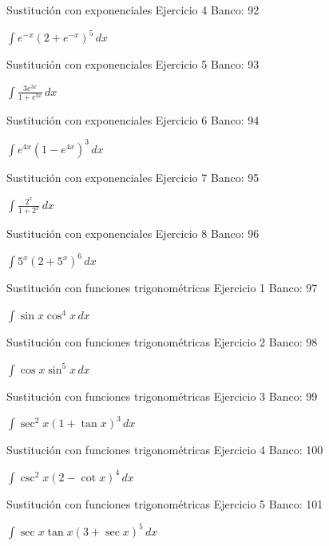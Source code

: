 \documentclass[aspectratio=169,12pt]{beamer}
\newcommand{\ejercicio}[1]{%
  \begin{center}
  \vfill
  {\fontsize{24}{30}\selectfont #1}
  \vfill
  \end{center}
}
\begin{document}
\begin{frame}{Sustitución con exponenciales}
\small Ejercicio 4 \hfill Banco: 92
\ejercicio{$\displaystyle \int e^{-x}(2+e^{-x})^5\,dx$}
\end{frame}

\begin{frame}{Sustitución con exponenciales}
\small Ejercicio 5 \hfill Banco: 93
\ejercicio{$\displaystyle \int\frac{3e^{3x}}{1+e^{3x}}\,dx$}
\end{frame}

\begin{frame}{Sustitución con exponenciales}
\small Ejercicio 6 \hfill Banco: 94
\ejercicio{$\displaystyle \int e^{4x}(1-e^{4x})^3\,dx$}
\end{frame}

\begin{frame}{Sustitución con exponenciales}
\small Ejercicio 7 \hfill Banco: 95
\ejercicio{$\displaystyle \int\frac{2^x}{1+2^x}\,dx$}
\end{frame}

\begin{frame}{Sustitución con exponenciales}
\small Ejercicio 8 \hfill Banco: 96
\ejercicio{$\displaystyle \int 5^x(2+5^x)^6\,dx$}
\end{frame}

\begin{frame}{Sustitución con funciones trigonométricas}
\small Ejercicio 1 \hfill Banco: 97
\ejercicio{$\displaystyle \int\sin x\cos^4x\,dx$}
\end{frame}

\begin{frame}{Sustitución con funciones trigonométricas}
\small Ejercicio 2 \hfill Banco: 98
\ejercicio{$\displaystyle \int\cos x\sin^5x\,dx$}
\end{frame}

\begin{frame}{Sustitución con funciones trigonométricas}
\small Ejercicio 3 \hfill Banco: 99
\ejercicio{$\displaystyle \int\sec^2x(1+\tan x)^3\,dx$}
\end{frame}

\begin{frame}{Sustitución con funciones trigonométricas}
\small Ejercicio 4 \hfill Banco: 100
\ejercicio{$\displaystyle \int\csc^2x(2-\cot x)^4\,dx$}
\end{frame}

\begin{frame}{Sustitución con funciones trigonométricas}
\small Ejercicio 5 \hfill Banco: 101
\ejercicio{$\displaystyle \int\sec x\tan x(3+\sec x)^5\,dx$}
\end{frame}
\end{document}
